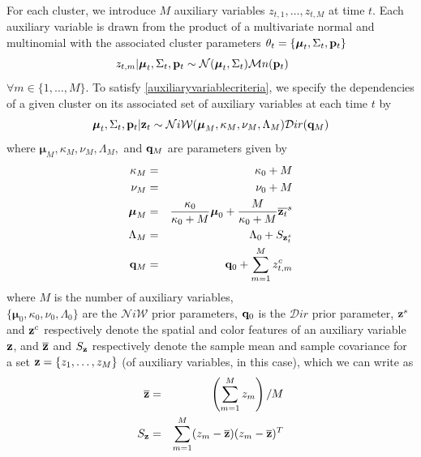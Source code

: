 \documentclass{article}
\begin{document}
For each cluster, we introduce $M$ auxiliary variables $z_{t, 1}, \ldots, z_{t, M}$ at time $t$. Each auxiliary variable is drawn from the product of a multivariate normal and multinomial with the associated cluster parameters $\theta_{t} = \{ \boldsymbol{\mu}_{t}, \Sigma_{t}, \bold{p}_{t} \}$
\begin{equation}
\label{transker1}
z_{t, m} | \boldsymbol{\mu}_{t}, \Sigma_{t}, \bold{p}_{t}  \sim  \mathcal{N}(\boldsymbol{\mu}_{t}, \Sigma_{t}) \mathcal{M}n(\bold{p}_{t})   \hspace{15pt}   
\end{equation}
$\forall m \in \{ 1, \ldots, M \}$. To satisfy \eqref{auxiliaryvariablecriteria}, we specify the dependencies of a given cluster on its associated set of auxiliary variables at each time $t$ by
\begin{equation}
\label{transker2}
\boldsymbol{\mu}_{t}, \Sigma_{t}, \bold{p}_{t} | \bold{z}_t  \sim  \mathcal{N}i\mathcal{W}(\boldsymbol{\mu}_{M}, \kappa_{M}, \nu_{M}, \Lambda_{M})  \mathcal{D}ir(\bold{q}_{M})
\end{equation}
where $\boldsymbol{\mu}_{M}, \kappa_{M}, \nu_{M}, \Lambda_{M},$ and $\bold{q}_{M}$ are parameters given by
\begin{eqnarray}
\kappa_{M} &=& \kappa_{0} + M \\
\nu_{M} &=& \nu_{0} + M \\
\boldsymbol{\mu}_{M} &=& \frac{\kappa_{0}}{\kappa_{0}+M} \boldsymbol{\mu}_{0}  +  \frac{M}{\kappa_{0}+M} \overline{\bold{z}_t}^{s}\\
\Lambda_{M} &=& \Lambda_{0} + S_{\bold{z}_{t}^{s}}\\
\bold{q}_{M} &=& \bold{q}_{0} + \sum_{m=1}^{M} z_{t,m}^{c}
\end{eqnarray}
where $M$ is the number of auxiliary variables, \\
$\{ \boldsymbol{\mu}_{0}, \kappa_{0}, \nu_{0}, \Lambda_{0} \}$ are the $\mathcal{N}i\mathcal{W}$ prior parameters, $\bold{q}_{0}$ is the $\mathcal{D}ir$ prior parameter, $\bold{z}^{s}$ and $\bold{z}^{c}$ respectively denote the spatial and color features of an auxiliary variable $\bold{z}$, and $\overline{\bold{z}}$ and $S_{\bold{z}}$ respectively denote the sample mean and sample covariance for a set $\bold{z} = \{ z_{1}, \ldots, z_{M} \}$ (of auxiliary variables, in this case), which we can write as
\begin{eqnarray}
\label{samplemean}
\overline{\bold{z}}  &=&  \left( \sum_{m=1}^{M} z_{m} \right) / M\\
\label{samplecov}
S_{\bold{z}}  &=&  \sum_{m=1}^{M} (z_{m} - \overline{\bold{z}}) (z_{m} - \overline{\bold{z}})^{T}
\end{eqnarray}
\end{document}
